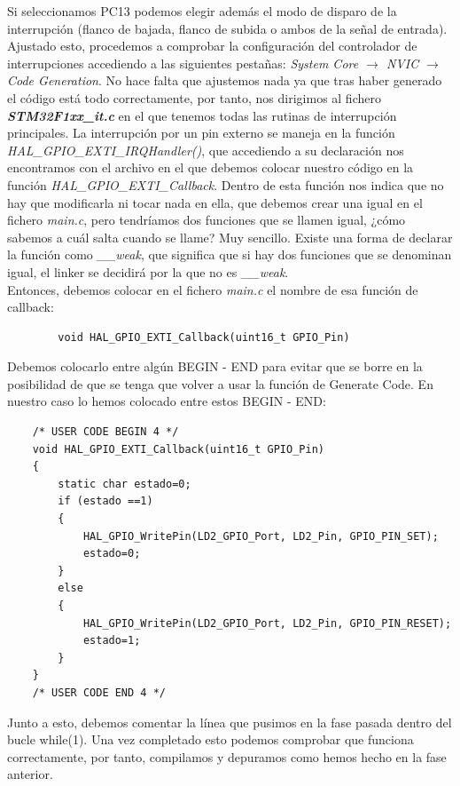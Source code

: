 \documentclass[11pt,a4paper]{article}
\begin{document}
	Si seleccionamos PC13 podemos elegir además el modo de disparo de la interrupción (flanco de bajada, flanco de subida o ambos de la señal de entrada). Ajustado esto, procedemos a comprobar la configuración del controlador de interrupciones accediendo a las siguientes pestañas: \textit{System Core $\rightarrow$ NVIC $\rightarrow$ Code Generation}. No hace falta que ajustemos nada ya que tras haber generado el código está todo correctamente, por tanto, nos dirigimos al fichero \textbf{\textit{STM32F1xx\_it.c}} en el que tenemos todas las rutinas de interrupción principales. La interrupción por un pin externo se maneja en la función \textit{HAL\_GPIO\_EXTI\_IRQHandler()}, que accediendo a su declaración nos encontramos con el archivo en el que debemos colocar nuestro código en la función \textit{HAL\_GPIO\_EXTI\_Callback}. Dentro de esta función nos indica que no hay que modificarla ni tocar nada en ella, que debemos crear una igual en el fichero \textit{main.c}, pero tendríamos dos funciones que se llamen igual, ¿cómo sabemos a cuál salta cuando se llame? Muy sencillo. Existe una forma de declarar la función como \textit{\_\_weak}, que significa que si hay dos funciones que se denominan igual, el linker se decidirá por la que no es \textit{\_\_weak}.\\
	
	Entonces, debemos colocar en el fichero \textit{main.c} el nombre de esa función de callback:
	\begin{lstlisting}
		void HAL_GPIO_EXTI_Callback(uint16_t GPIO_Pin)
	\end{lstlisting}
	\vspace{1em}
	
	Debemos colocarlo entre algún BEGIN - END para evitar que se borre en la posibilidad de que se tenga que volver a usar la función de Generate Code. En nuestro caso lo hemos colocado entre estos BEGIN - END:
	\begin{lstlisting}
	/* USER CODE BEGIN 4 */
	void HAL_GPIO_EXTI_Callback(uint16_t GPIO_Pin)
	{
		static char estado=0;
		if (estado ==1)
		{
			HAL_GPIO_WritePin(LD2_GPIO_Port, LD2_Pin, GPIO_PIN_SET);
			estado=0;
		}
		else
		{
			HAL_GPIO_WritePin(LD2_GPIO_Port, LD2_Pin, GPIO_PIN_RESET);
			estado=1;
		}
	}
	/* USER CODE END 4 */
	\end{lstlisting}
	\vspace{1em}
	
	Junto a esto, debemos comentar la línea que pusimos en la fase pasada dentro del bucle while(1). Una vez completado esto podemos comprobar que funciona correctamente, por tanto, compilamos y depuramos como hemos hecho en la fase anterior.\\
	
\end{document}
